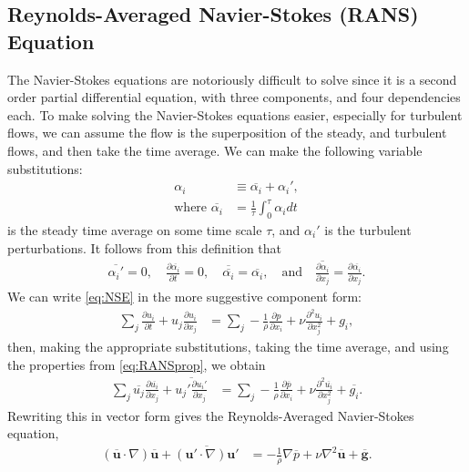 \documentclass[10pt, titlepage]{article}
\begin{document}
\subsection{Reynolds-Averaged Navier-Stokes (RANS) Equation}
The Navier-Stokes equations are notoriously difficult to solve since it is a second order partial differential equation, with three components, and four dependencies each. To make solving the Navier-Stokes equations easier, especially for turbulent flows, we can assume the flow is the superposition of the steady, and turbulent flows, and then take the time average. We can make the following variable substitutions:
\begin{align*}
\alpha_i &\equiv \overline{\alpha_i} + \alpha_i', \\
\text{where } \overline{\alpha_i} &= \frac{1}{\tau} \int_0^\tau \alpha_i dt
\end{align*}
is the steady time average on some time scale $\tau$, and $\alpha_i'$ is the turbulent perturbations. It follows from this definition that
\begin{align}
\overline{\alpha_i'} = 0, \quad \frac{\partial \overline{\alpha_i}}{\partial t} = 0, \quad \overline{\overline{\alpha_i}} = \overline{\alpha_i}, \quad \text{and} \quad \overline{\frac{\partial \alpha_i}{\partial x_j}} =  \frac{\partial \overline{\alpha_i}}{\partial x_j}. \label{eq:RANSprop}
\end{align}
We can write \eqref{eq:NSE} in the more suggestive component form:
\begin{align*}
\sum_j \frac{\partial u_i}{\partial t} + u_j \frac{\partial u_i}{\partial x_j} &= \sum_j  -\frac{1}{\rho} \frac{\partial p}{\partial x_i} + \nu \frac{\partial^2 u_i}{\partial x_j^2} + g_i,
\end{align*}
then, making the appropriate substitutions, taking the time average, and using the properties from  \eqref{eq:RANSprop}, we obtain
\begin{align*}
\sum_j \overline{u_j} \frac{\partial \overline{u_i}}{\partial x_j} + \overline{u_j' \frac{\partial u_i'}{\partial x_j}} &= \sum_j  -\frac{1}{\rho} \frac{\partial \overline{p}}{\partial x_i} + \nu \frac{\partial^2 \overline{u_i}}{\partial x_j^2} + \overline{g_i}.
\end{align*}
Rewriting this in vector form gives the Reynolds-Averaged Navier-Stokes equation,
\begin{align}
\left( \mathbf{\overline{u}} \cdot \nabla \right) \mathbf{\overline{u}} + \overline{\left( \mathbf{u'} \cdot \nabla \right) \mathbf{u'}} &= - \frac{1}{\rho} \nabla \overline{p} + \nu \nabla^2 \mathbf{\overline{u}} + \mathbf{\overline{g}}. \label{eq:RANS}
\end{align}
\end{document}
